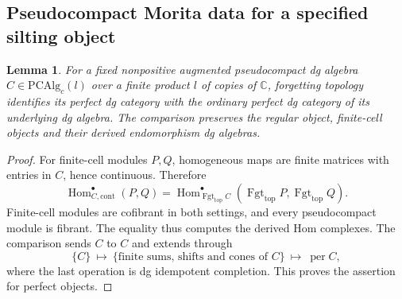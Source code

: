 \documentclass[12pt,a4paper,english,reqno]{amsart}
\theoremstyle{plain}
\newtheorem{lem}[thm]{Lemma}
\theoremstyle{definition}
\numberwithin{equation}{section}
\def\Hom{\operatorname{Hom}}
\def\bbC{{\mathbb C}}
\newcommand{\Fgt}{\operatorname{Fgt}}
\begin{document}
\subsection{Pseudocompact Morita data for a specified silting object}
\begin{lem}\label{lem:pc-perfect}
For a fixed nonpositive augmented pseudocompact dg algebra $C\in\mathrm{PCAlg}_c(l)$ over a finite product $l$ of copies of $\bbC$, forgetting topology identifies its perfect dg category with the ordinary perfect dg category of its underlying dg algebra. The comparison preserves the regular object, finite-cell objects and their derived endomorphism dg algebras.
\end{lem}
\begin{proof}
For finite-cell modules $P,Q$, homogeneous maps are finite matrices
with entries in $C$, hence continuous. Therefore
\[
 \Hom^\bullet_{C,\mathrm{cont}}(P,Q)
 =\Hom^\bullet_{\Fgt_{\mathrm{top}} C}(\Fgt_{\mathrm{top}} P,\Fgt_{\mathrm{top}} Q).
\]
Finite-cell modules are cofibrant in both settings, and every
pseudocompact module is fibrant. The equality thus computes the
derived Hom complexes. The comparison sends $C$ to $C$ and extends
through
\[
 \{C\}\ \longmapsto\
 \{\text{finite sums, shifts and cones of }C\}
 \ \longmapsto\ \operatorname{per}C,
\]
where the last operation is dg idempotent completion. This proves
the assertion for perfect objects.
\end{proof}
\end{document}

